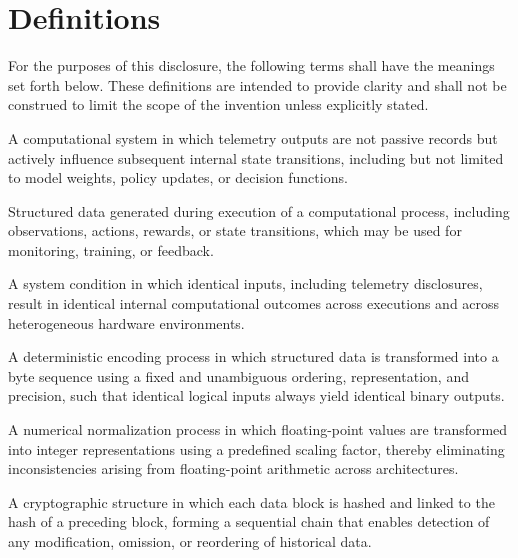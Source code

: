 \chapter*{Definitions}

For the purposes of this disclosure, the following terms shall have the meanings set forth below. These definitions are intended to provide clarity and shall not be construed to limit the scope of the invention unless explicitly stated.

\begin{definition}
A computational system in which telemetry outputs are not passive records but actively influence subsequent internal state transitions, including but not limited to model weights, policy updates, or decision functions.
\end{definition}

\begin{definition}[Telemetry]
Structured data generated during execution of a computational process, including observations, actions, rewards, or state transitions, which may be used for monitoring, training, or feedback.
\end{definition}

\begin{definition}
A system condition in which identical inputs, including telemetry disclosures, result in identical internal computational outcomes across executions and across heterogeneous hardware environments.
\end{definition}

\begin{definition}
A deterministic encoding process in which structured data is transformed into a byte sequence using a fixed and unambiguous ordering, representation, and precision, such that identical logical inputs always yield identical binary outputs.
\end{definition}

\begin{definition}
A numerical normalization process in which floating-point values are transformed into integer representations using a predefined scaling factor, thereby eliminating inconsistencies arising from floating-point arithmetic across architectures.
\end{definition}

\begin{definition}
A cryptographic structure in which each data block is hashed and linked to the hash of a preceding block, forming a sequential chain that enables detection of any modification, omission, or reordering of historical data.
\end{definition}

